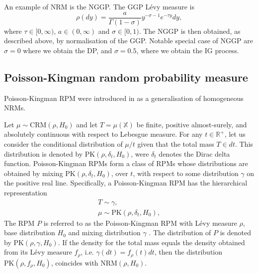 An example of \gls{NRM} is the \gls{NGGP}. The GGP Lévy measure is
\begin{equation} \label{eq:GGP}
\rho(dy) = \frac{a}{\Gamma(1 - \sigma)}y^{-\sigma-1}e^{-\tau y} dy,
\end{equation}
where $\tau \in [0,\infty)$, $a \in (0, \infty)$ and $\sigma \in [0, 1)$. The \gls{NGGP} is then obtained, as described above, by normalisation of the GGP. Notable special case of \gls{NGGP} are $\sigma = 0$ where we obtain the \gls{DP}, and $\sigma=0.5$, where we obtain the \gls{IG} process.


\subsection{Poisson-Kingman random probability measure}
Poisson-Kingman \gls{RPM} were introduced in \cite{pitman2003pkp} as a generalisation of homogeneous NRMs. \\

\begin{definition} \label{def:PKRPM}
Let $\mu \sim \text{CRM}(\rho, H_0)$ and let $T = \mu(\mathbb{X})$ be finite, positive almost-surely, and absolutely continuous with respect to Lebesgue measure. For any $t \in \mathbb{R}^+$, let us consider the conditional distribution of $\mu/t$ given that the total mass $T \in dt$. This distribution is denoted by $\text{PK}(\rho, \delta_t , H_0)$, were $\delta_t$ denotes the Dirac delta function. Poisson-Kingman \glspl{RPM} form a class of \glspl{RPM} whose distributions are obtained by mixing $\text{PK}(\rho, \delta_t , H_0)$, over $t$, with respect to some distribution  $\gamma$ on the positive real line. Specifically, a Poisson-Kingman \gls{RPM} has the hierarchical representation
\begin{gather*}
T \sim \gamma, \\
\mu \sim \text{PK}(\rho, \delta_t, H_0),
\end{gather*}
The \gls{RPM} $P$ is referred to as the Poisson-Kingman \gls{RPM} with Lévy measure $\rho$, base distribution $H_0$ and mixing distribution $\gamma$ . The distribution of $P$ is denoted by $\text{PK}(\rho, \gamma , H_0)$. If the density for the total mass equals the density obtained from its Lévy measure $f_\rho$, i.e. $\gamma(dt) = f_\rho(t) dt$, then the distribution $\text{PK}(\rho, f_\rho , H_0)$, coincides with $\text{NRM} (\rho, H_0)$.
\end{definition}

